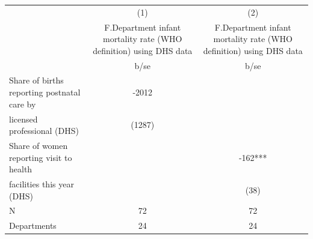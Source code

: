 {
\def\sym#1{\ifmmode^{#1}\else\(^{#1}\)\fi}
\begin{tabular}{l*{2}{c}}
\hline\hline
                                                  &\multicolumn{1}{c}{(1)}&\multicolumn{1}{c}{(2)}\\
                                                  &\multicolumn{1}{c}{F.Department infant mortality rate (WHO definition) using DHS data}&\multicolumn{1}{c}{F.Department infant mortality rate (WHO definition) using DHS data}\\
                                                  &        b/se   &        b/se   \\
\hline
Share of births reporting postnatal care by       &       -2012   &               \\
licensed professional (DHS)                       &      (1287)   &               \\
Share of women reporting visit to health          &               &        -162***\\
facilities this year (DHS)                        &               &        (38)   \\
\hline
N                                                 &          72   &          72   \\
Departments                                       &          24   &          24   \\
\hline\hline
\end{tabular}
}
